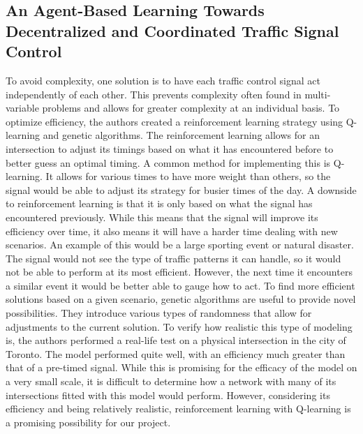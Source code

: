 \documentclass[10pt,letterpaper,draftclsnofoot,onecolumn]{IEEEtran}
\begin{document}
\subsection{An Agent-Based Learning Towards Decentralized and Coordinated Traffic Signal Control \cite{el2010agent}}
To avoid complexity, one solution is to have each traffic control signal act independently of each other. This prevents complexity often found in multi-variable problems and allows for greater complexity at an individual basis. To optimize efficiency, the authors created a reinforcement learning strategy using Q-learning and genetic algorithms. The reinforcement learning allows for an intersection to adjust its timings based on what it has encountered before to better guess an optimal timing. A common method for implementing this is Q-learning. It allows for various times to have more weight than others, so the signal would be able to adjust its strategy for busier times of the day. A downside to reinforcement learning is that it is only based on what the signal has encountered previously. While this means that the signal will improve its efficiency over time, it also means it will have a harder time dealing with new scenarios. An example of this would be a large sporting event or natural disaster. The signal would not see the type of traffic patterns it can handle, so it would not be able to perform at its most efficient. However, the next time it encounters a similar event it would be better able to gauge how to act. To find more efficient solutions based on a given scenario, genetic algorithms are useful to provide novel possibilities. They introduce various types of randomness that allow for adjustments to the current solution. To verify how realistic this type of modeling is, the authors performed a real-life test on a physical intersection in the city of Toronto. The model performed quite well, with an efficiency much greater than that of a pre-timed signal. While this is promising for the efficacy of the model on a very small scale, it is difficult to determine how a network with many of its intersections fitted with this model would perform. However, considering its efficiency and being relatively realistic, reinforcement learning with Q-learning is a promising possibility for our project.
\end{document}
